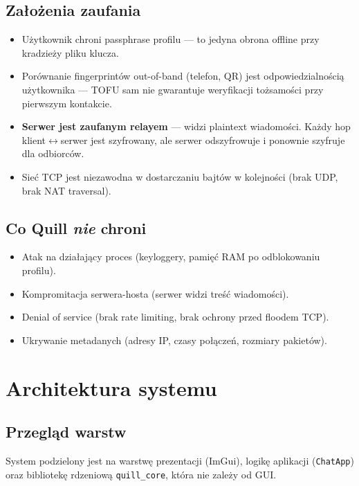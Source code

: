 \documentclass[12pt,a4paper]{article}
\begin{document}
\subsection{Założenia zaufania}

\begin{itemize}
    \item Użytkownik chroni passphrase profilu --- to jedyna obrona offline przy kradzieży pliku klucza.
    \item Porównanie fingerprintów out-of-band (telefon, QR) jest odpowiedzialnością użytkownika --- TOFU sam nie gwarantuje weryfikacji tożsamości przy pierwszym kontakcie.
    \item \textbf{Serwer jest zaufanym relayem} --- widzi plaintext wiadomości. Każdy hop klient$\leftrightarrow$serwer jest szyfrowany, ale serwer odszyfrowuje i ponownie szyfruje dla odbiorców.
    \item Sieć TCP jest niezawodna w dostarczaniu bajtów w kolejności (brak UDP, brak NAT traversal).
\end{itemize}

\subsection{Co Quill \emph{nie} chroni}

\begin{itemize}
    \item Atak na działający proces (keyloggery, pamięć RAM po odblokowaniu profilu).
    \item Kompromitacja serwera-hosta (serwer widzi treść wiadomości).
    \item Denial of service (brak rate limiting, brak ochrony przed floodem TCP).
    \item Ukrywanie metadanych (adresy IP, czasy połączeń, rozmiary pakietów).
\end{itemize}

\section{Architektura systemu}

\subsection{Przegląd warstw}

System podzielony jest na warstwę prezentacji (ImGui), logikę aplikacji (\texttt{ChatApp}) oraz bibliotekę rdzeniową \texttt{quill\_core}, która nie zależy od GUI.
\end{document}
